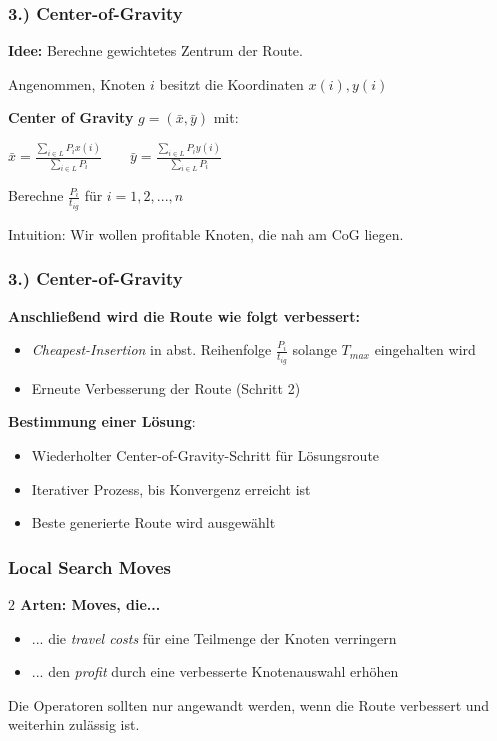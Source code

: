 \documentclass{beamer}
\begin{document}
\begin{frame}
  \frametitle{3.) Center-of-Gravity}
  \textbf{Idee:} Berechne gewichtetes Zentrum der Route.\newline
  
  Angenommen, Knoten $i$ besitzt die Koordinaten $x(i), y(i)$\newline
  
  \textbf{Center of Gravity} $g = (\bar{x}, \bar{y})$ mit:\newline

  $\bar{x} = \frac{\sum_{i \in L} P_i x(i)}{\sum_{i \in L} P_i} \quad\quad
  \bar{y} = \frac{\sum_{i \in L} P_i y(i)}{\sum_{i \in L} P_i}$\newline

  Berechne $\frac{P_i}{t_{ig}}$ für $i = 1, 2, ..., n$\newline
  
  Intuition: Wir wollen profitable Knoten, die nah am CoG liegen.
\end{frame}

\begin{frame}
  \frametitle{3.) Center-of-Gravity}
  \textbf{Anschließend wird die Route wie folgt verbessert:}
  \begin{itemize}  
    \item \textit{Cheapest-Insertion} in abst. Reihenfolge $\frac{P_i}{t_{ig}}$ solange $T_{max}$ eingehalten wird
    \item Erneute Verbesserung der Route (Schritt 2)
  \end{itemize}
  \textbf{Bestimmung einer Lösung}:
  \begin{itemize}
    \item Wiederholter Center-of-Gravity-Schritt für Lösungsroute
    \item Iterativer Prozess, bis Konvergenz erreicht ist
    \item Beste generierte Route wird ausgewählt
  \end{itemize}
\end{frame}

\begin{frame}
  \frametitle{Local Search Moves}
  \textbf{$2$ Arten: Moves, die...}
  \begin{itemize}
    \item ... die \textit{travel costs} für eine Teilmenge der Knoten verringern
    \item ... den \textit{profit} durch eine verbesserte Knotenauswahl erhöhen
  \end{itemize}
  Die Operatoren sollten nur angewandt werden, wenn die Route verbessert und weiterhin zulässig ist.
\end{frame}
\end{document}
